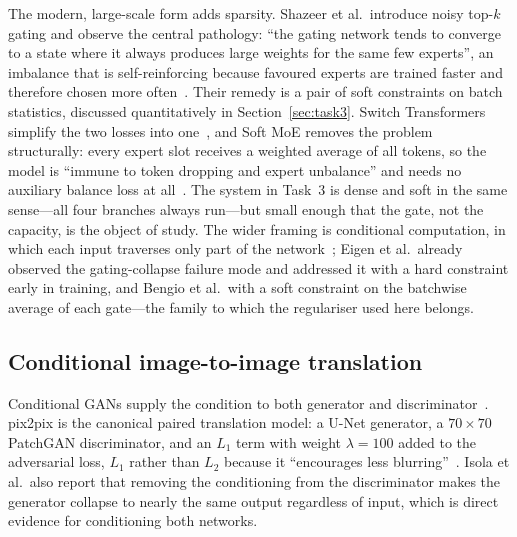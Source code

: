 \documentclass[conference]{IEEEtran}
\begin{document}
The modern, large-scale form adds sparsity. Shazeer et al.\ introduce noisy
top-$k$ gating and observe the central pathology: ``the gating network tends to
converge to a state where it always produces large weights for the same few
experts'', an imbalance that is self-reinforcing because favoured experts are
trained faster and therefore chosen more often~\cite{shazeer2017outrageously}.
Their remedy is a pair of soft constraints on batch statistics, discussed
quantitatively in Section~\ref{sec:task3}. Switch Transformers simplify the two
losses into one~\cite{fedus2022switch,lepikhin2021gshard}, and Soft MoE removes
the problem structurally: every expert slot receives a weighted average of all
tokens, so the model is ``immune to token dropping and expert unbalance'' and
needs no auxiliary balance loss at all~\cite{puigcerver2024soft}. The system in
Task~3 is dense and soft in the same sense---all four branches always run---but
small enough that the gate, not the capacity, is the object of study. The wider
framing is conditional computation, in which each input traverses only part of
the network~\cite{bengio2015conditional,eigen2013learning}; Eigen et al.\ already
observed the gating-collapse failure mode and addressed it with a hard constraint
early in training, and Bengio et al.\ with a soft constraint on the batchwise
average of each gate---the family to which the regulariser used here belongs.

\subsection{Conditional image-to-image translation}

Conditional GANs supply the condition to both generator and
discriminator~\cite{goodfellow2014generative,mirza2014conditional}. pix2pix is
the canonical paired translation model: a U-Net generator, a $70 \times 70$
PatchGAN discriminator, and an $L_1$ term with weight $\lambda = 100$ added to
the adversarial loss, $L_1$ rather than $L_2$ because it ``encourages less
blurring''~\cite{isola2017image}. Isola et al.\ also report that removing the
conditioning from the discriminator makes the generator collapse to nearly the
same output regardless of input, which is direct evidence for conditioning both
networks.
\end{document}
